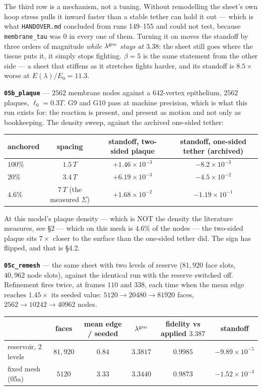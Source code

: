 \documentclass[10pt,a4paper]{article}
\newcommand{\code}[1]{\texttt{#1}}
\newcommand{\op}[1]{\texttt{#1}}
\begin{document}
The third row is a mechanism, not a tuning. Without remodelling the sheet's own hoop stress pulls it
inward faster than a stable tether can hold it out --- which is what \code{HANDOVER.md} concluded from
runs 149--155 and could not test, because \code{membrane\_tau} was $0$ in every one of them. Turning it
on moves the standoff by three orders of magnitude \emph{while $\lambda^{\rm geo}$ stays at $3.38$}: the
sheet still goes where the tissue puts it, it simply stops fighting. $\beta=5$ is the same statement
from the other side --- a sheet that stiffens as it stretches fights harder, and its standoff is
$8.5\times$ worse at $E(\lambda)/E_0=11.3$.

\textbf{\op{05b\_plaque}} --- $2562$ membrane nodes against a $642$-vertex epithelium, $2562$ plaques,
$\ell_0=0.3T$. G9 and G10 pass at machine precision, which is what this run exists for: the reaction is
present, and present as motion and not only as bookkeeping. The density sweep, against the archived
one-sided tether:

\smallskip
{\small\begin{tabular}{@{}lccc@{}}\toprule
anchored & spacing & standoff, two-sided plaque & standoff, one-sided tether (archived)\\\midrule
$100\%$ & $1.5\,T$ & $+1.46\times10^{-3}$ & $-8.2\times10^{-3}$\\
$20\%$  & $3.4\,T$ & $+6.19\times10^{-3}$ & $-4.5\times10^{-2}$\\
$4.6\%$ & $7\,T$ (the measured $\Sigma$) & $+1.68\times10^{-2}$ & $-1.19\times10^{-1}$\\
\bottomrule\end{tabular}}
\smallskip

At this model's plaque density --- which is NOT the density the literature measures, see \S2 ---
which on this mesh is $4.6\%$ of the nodes --- the two-sided plaque sits $7\times$ closer to the surface
than the one-sided tether did. The sign has flipped, and that is \S4.2.

\textbf{\op{05c\_remesh}} --- the same sheet with two levels of reserve ($81{,}920$ face slots,
$40{,}962$ node slots), against the identical run with the reserve switched off. Refinement fires twice,
at frames $110$ and $338$, each time when the mean edge reaches $1.45\times$ its seeded value:
$5120\to20480\to81920$ faces, $2562\to10242\to40962$ nodes.

\smallskip
{\small\begin{tabular}{@{}lccccc@{}}\toprule
& faces & mean edge / seeded & $\lambda^{\rm geo}$ & fidelity vs applied $3.387$ & standoff\\\midrule
reservoir, 2 levels & $81{,}920$ & $\mathbf{0.84}$ & $3.3817$ & $\mathbf{0.9985}$ &
  $-9.89\times10^{-5}$\\
fixed mesh (05a)    & $5120$     & $3.33$          & $3.3440$ & $0.9873$ & $-1.52\times10^{-3}$\\
\bottomrule\end{tabular}}
\smallskip
\end{document}
